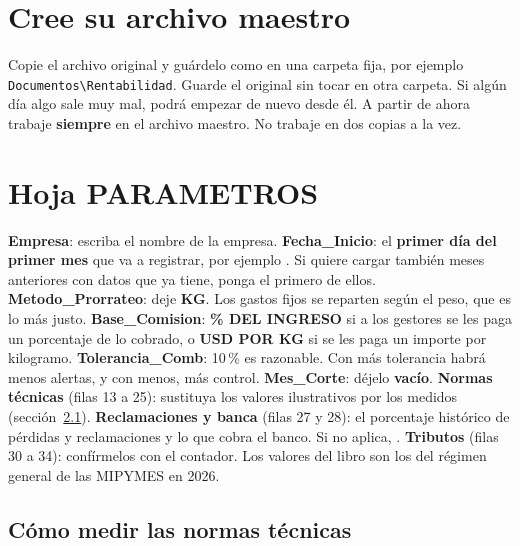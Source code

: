 \section{Cree su archivo maestro}

\begin{pasos}
\paso Copie el archivo original \libro{} y guárdelo como  en una carpeta fija, por ejemplo
      \texttt{Documentos\textbackslash Rentabilidad}.
\paso Guarde el original sin tocar en otra carpeta. Si algún día algo sale muy mal, podrá empezar de nuevo desde él.
\paso A partir de ahora trabaje \textbf{siempre} en el archivo maestro. No trabaje en dos copias a la vez.
\end{pasos}

\section{Hoja PARAMETROS}


\begin{pasos}
\paso {} \textbf{Empresa}: escriba el nombre de la empresa.
\paso {} \textbf{Fecha\_Inicio}: el \textbf{primer día del primer mes} que va a registrar, por ejemplo .
      Si quiere cargar también meses anteriores con datos que ya tiene, ponga el primero de ellos.
\paso {} \textbf{Metodo\_Prorrateo}: deje \textbf{KG}. Los gastos fijos se reparten según el peso, que es lo más justo.
\paso {} \textbf{Base\_Comision}: \textbf{\% DEL INGRESO} si a los gestores se les paga un porcentaje de lo cobrado, o
      \textbf{USD POR KG} si se les paga un importe por kilogramo.
\paso {} \textbf{Tolerancia\_Comb}: 10\,\% es razonable. Con más tolerancia habrá menos alertas, y con menos, más control.
\paso {} \textbf{Mes\_Corte}: déjelo \textbf{vacío}.
\paso \textbf{Normas técnicas} (filas 13 a 25): sustituya los valores ilustrativos por los medidos (sección~\ref{sec:medir}).
\paso \textbf{Reclamaciones y banca} (filas 27 y 28): el porcentaje histórico de pérdidas y reclamaciones y lo que cobra el banco. Si no aplica, .
\paso \textbf{Tributos} (filas 30 a 34): confírmelos con el contador. Los valores del libro son los del régimen general de las MIPYMES en 2026.
\end{pasos}

\subsection{Cómo medir las normas técnicas}\label{sec:medir}

